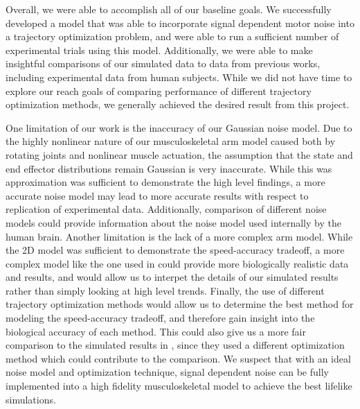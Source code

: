 \documentclass[letterpaper, 10pt, conference]{ieeeconf}
\begin{document}
Overall, we were able to accomplish all of our baseline goals. We successfully developed a model that was able to incorporate signal dependent motor noise into a trajectory optimization problem, and were able to run a sufficient number of experimental trials using this model. Additionally, we were able to make insightful comparisons of our simulated data to data from previous works, including experimental data from human subjects. While we did not have time to explore our reach goals of comparing performance of different trajectory optimization methods, we generally achieved the desired result from this project.

\par One limitation of our work is the inaccuracy of our Gaussian noise model. Due to the highly nonlinear nature of our musculoskeletal arm model caused both by rotating joints and nonlinear muscle actuation, the assumption that the state and end effector distributions remain Gaussian is very inaccurate. While this was approximation was sufficient to demonstrate the high level findings, a more accurate noise model may lead to more accurate results with respect to replication of experimental data. Additionally, comparison of different noise models could provide information about the noise model used internally by the human brain. Another limitation is the lack of a more complex arm model. While the 2D model was sufficient to demonstrate the speed-accuracy tradeoff, a more complex model like the one used in \cite{c5} could provide more biologically realistic data and results, and would allow us to interpet the details of our simulated results rather than simply looking at high level trends. Finally, the use of different trajectory optimization methods would allow us to determine the best method for modeling the speed-accuracy tradeoff, and therefore gain insight into the biological accuracy of each method. This could also give us a more fair comparison to the simulated results in \cite{c5}, since they used a different optimization method which could contribute to the comparison. We suspect that with an ideal noise model and optimization technique, signal dependent noise can be fully implemented into a high fidelity musculoskeletal model to achieve the best lifelike simulations.



\end{document}
